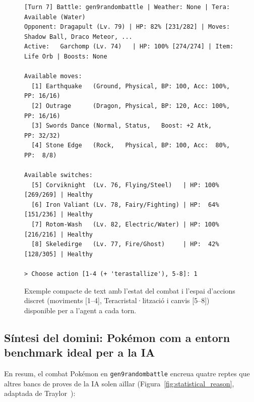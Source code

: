 \begin{figure}[htbp]
    \hspace*{2cm}%
    \begin{minipage}{0.88\textwidth}
        \begin{scriptsize}
\begin{verbatim}
[Turn 7] Battle: gen9randombattle | Weather: None | Tera: Available (Water)
Opponent: Dragapult (Lv. 79) | HP: 82% [231/282] | Moves: Shadow Ball, Draco Meteor, ...
Active:   Garchomp (Lv. 74)   | HP: 100% [274/274] | Item: Life Orb | Boosts: None

Available moves:
  [1] Earthquake   (Ground, Physical, BP: 100, Acc: 100%, PP: 16/16)
  [2] Outrage      (Dragon, Physical, BP: 120, Acc: 100%, PP: 16/16)
  [3] Swords Dance (Normal, Status,   Boost: +2 Atk,     PP: 32/32)
  [4] Stone Edge   (Rock,   Physical, BP: 100, Acc:  80%, PP:  8/8)

Available switches:
  [5] Corviknight  (Lv. 76, Flying/Steel)   | HP: 100% [269/269] | Healthy
  [6] Iron Valiant (Lv. 78, Fairy/Fighting) | HP:  64% [151/236] | Healthy
  [7] Rotom-Wash   (Lv. 82, Electric/Water) | HP: 100% [216/216] | Healthy
  [8] Skeledirge   (Lv. 77, Fire/Ghost)     | HP:  42% [128/305] | Healthy

> Choose action [1-4 (+ 'terastallize'), 5-8]: 1
\end{verbatim}
        \end{scriptsize}
    \end{minipage}
    \caption{Exemple compacte de text amb l'estat del combat i l'espai d'accions discret (moviments [1--4], Teracristal·lització i canvis [5--8]) disponible per a l'agent a cada torn.}
    \label{fig:terminal_battle_example}
\end{figure}

\subsection{Síntesi del domini: Pokémon com a entorn benchmark ideal per a la IA}
\label{subsec:sintesi_domini}

En resum, el combat Pokémon en \texttt{gen9randombattle} encreua quatre reptes que altres bancs de proves de la IA solen aïllar (Figura~\ref{fig:statistical_reason}, adaptada de Traylor~\cite{traylor_competitive_pokemon}):

